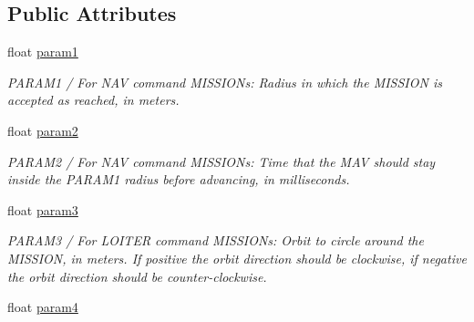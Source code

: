\subsection*{Public Attributes}
\begin{DoxyCompactItemize}
\item 
\hypertarget{struct____mavlink__mission__item__t_a7b622b789be829088a8c9353946a4f28}{float \hyperlink{struct____mavlink__mission__item__t_a7b622b789be829088a8c9353946a4f28}{param1}}\label{struct____mavlink__mission__item__t_a7b622b789be829088a8c9353946a4f28}

\begin{DoxyCompactList}\small\item\em P\+A\+R\+A\+M1 / For N\+A\+V command M\+I\+S\+S\+I\+O\+Ns\+: Radius in which the M\+I\+S\+S\+I\+O\+N is accepted as reached, in meters. \end{DoxyCompactList}\item 
\hypertarget{struct____mavlink__mission__item__t_ad523243067b6c47919554e8802f14b5c}{float \hyperlink{struct____mavlink__mission__item__t_ad523243067b6c47919554e8802f14b5c}{param2}}\label{struct____mavlink__mission__item__t_ad523243067b6c47919554e8802f14b5c}

\begin{DoxyCompactList}\small\item\em P\+A\+R\+A\+M2 / For N\+A\+V command M\+I\+S\+S\+I\+O\+Ns\+: Time that the M\+A\+V should stay inside the P\+A\+R\+A\+M1 radius before advancing, in milliseconds. \end{DoxyCompactList}\item 
\hypertarget{struct____mavlink__mission__item__t_a183425d5376a9173373279cc43ffce25}{float \hyperlink{struct____mavlink__mission__item__t_a183425d5376a9173373279cc43ffce25}{param3}}\label{struct____mavlink__mission__item__t_a183425d5376a9173373279cc43ffce25}

\begin{DoxyCompactList}\small\item\em P\+A\+R\+A\+M3 / For L\+O\+I\+T\+E\+R command M\+I\+S\+S\+I\+O\+Ns\+: Orbit to circle around the M\+I\+S\+S\+I\+O\+N, in meters. If positive the orbit direction should be clockwise, if negative the orbit direction should be counter-\/clockwise. \end{DoxyCompactList}\item 
\hypertarget{struct____mavlink__mission__item__t_a8db8965269e5523972f4645f9b52d86d}{float \hyperlink{struct____mavlink__mission__item__t_a8db8965269e5523972f4645f9b52d86d}{param4}}\label{struct____mavlink__mission__item__t_a8db8965269e5523972f4645f9b52d86d}


\end{DoxyCompactItemize}

